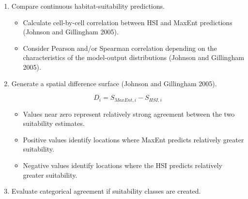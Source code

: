 \documentclass[
  letterpaper,
  DIV=11,
  numbers=noendperiod]{scrartcl}
\providecommand{\tightlist}{%
  \setlength{\itemsep}{0pt}\setlength{\parskip}{0pt}}
\begin{document}
\begin{enumerate}
\begin{enumerate}
    \begin{itemize}
    \tightlist
    \item
      Match geographic extent to permit spatial comparison (Johnson and
      Gillingham 2005; Geselbracht et al. 2024).
    \item
      Match coordinate reference systems.
    \item
      Match cell size and raster alignment.
    \item
      Ensure suitability scores are represented on directly comparable
      scales where possible (Johnson and Gillingham 2005).
    \end{itemize}
  \item
    Compare continuous habitat-suitability predictions.

    \begin{itemize}
    \tightlist
    \item
      Calculate cell-by-cell correlation between HSI and MaxEnt
      predictions (Johnson and Gillingham 2005).
    \item
      Consider Pearson and/or Spearman correlation depending on the
      characteristics of the model-output distributions (Johnson and
      Gillingham 2005).
    \end{itemize}
  \item
    Generate a spatial difference surface (Johnson and Gillingham 2005).

    \[
    D_i = S_{MaxEnt,i} - S_{HSI,i}
    \]

    \begin{itemize}
    \tightlist
    \item
      Values near zero represent relatively strong agreement between the
      two suitability estimates.
    \item
      Positive values identify locations where MaxEnt predicts
      relatively greater suitability.
    \item
      Negative values identify locations where the HSI predicts
      relatively greater suitability.
    \end{itemize}
  \item
    Evaluate categorical agreement if suitability classes are created.


\end{enumerate}
\end{enumerate}
\end{document}
